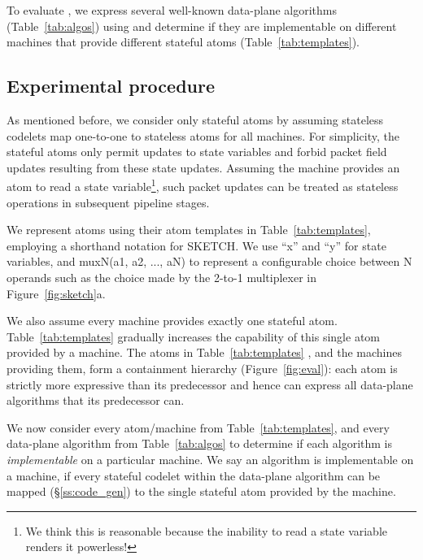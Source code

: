 To evaluate \pktlanguage, we express several well-known data-plane algorithms
(Table~\ref{tab:algos}) using \pktlanguage and determine if they are
implementable on different \absmachine machines that provide different stateful
atoms (Table~\ref{tab:templates}).

\subsection{Experimental procedure}
As mentioned before, we consider only stateful atoms by assuming stateless
codelets map one-to-one to stateless atoms for all \absmachine machines. For
simplicity, the stateful atoms only permit updates to state variables and
forbid packet field updates resulting from these state updates.  Assuming the
\absmachine machine provides an atom to read a state variable\footnote{We think
this is reasonable because the inability to read a state variable renders it
powerless!}, such packet updates can be treated as stateless operations in
subsequent pipeline stages.

We represent atoms using their atom templates in Table~\ref{tab:templates},
employing a shorthand notation for SKETCH. We use ``x'' and ``y'' for state
variables, and muxN(a1, a2, ..., aN) to represent a configurable choice between
N operands such as the choice made by the 2-to-1 multiplexer in
Figure~\ref{fig:sketch}a.

We also assume every \absmachine machine provides exactly one stateful atom.
Table~\ref{tab:templates} gradually increases the capability of this single
atom provided by a \absmachine machine.  The atoms in Table~\ref{tab:templates}
, and the \absmachine machines providing them, form a containment hierarchy
(Figure~\ref{fig:eval}): each atom is strictly more expressive than its
predecessor and hence can express all data-plane algorithms that its
predecessor can.

We now consider every atom/\absmachine machine from Table~\ref{tab:templates},
and every data-plane algorithm from Table~\ref{tab:algos} to determine if each
algorithm is \textit{implementable} on a particular \absmachine machine. We
say an algorithm is implementable on a \absmachine machine, if every stateful
codelet within the data-plane algorithm can be mapped (\S\ref{ss:code_gen}) to
the single stateful atom provided by the \absmachine machine.

